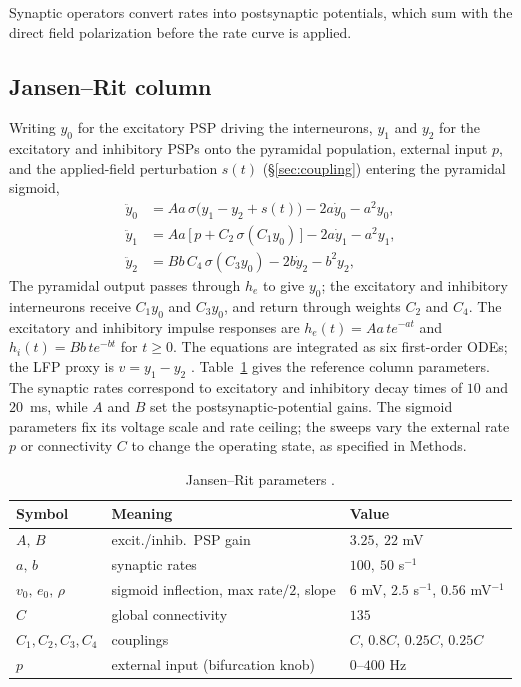 \documentclass[11pt,a4paper]{article}
\newcommand{\Sig}{\sigma}
\begin{document}
Synaptic operators convert rates into postsynaptic potentials, which sum with
the direct field polarization before the rate curve is applied.

\subsection*{Jansen--Rit column}
Writing $y_0$ for the excitatory PSP driving the interneurons, $y_1$ and $y_2$ for the
excitatory and inhibitory PSPs onto the pyramidal population, external input $p$, and the
applied-field perturbation $s(t)$ (\S\ref{sec:coupling}) entering the pyramidal sigmoid,
\begin{align}
\ddot y_0 &= Aa\,\Sig\!\big(y_1-y_2+s(t)\big)-2a\dot y_0-a^2 y_0, \label{eq:jr0}\\
\ddot y_1 &= Aa\,\big[\,p+C_2\,\Sig(C_1 y_0)\,\big]-2a\dot y_1-a^2 y_1,\\
\ddot y_2 &= Bb\,C_4\,\Sig(C_3 y_0)-2b\dot y_2-b^2 y_2,
\end{align}
The pyramidal output passes through $h_e$ to give $y_0$; the excitatory
and inhibitory interneurons receive $C_1y_0$ and $C_3y_0$, and return through
weights $C_2$ and $C_4$. The excitatory and inhibitory impulse responses are
$h_e(t)=Aa\,t e^{-at}$ and $h_i(t)=Bb\,t e^{-bt}$ for $t\ge0$.
The equations are integrated as six first-order ODEs; the LFP proxy is $v=y_1-y_2$ \cite{jansen1995}.
Table~\ref{tab:params} gives the reference column parameters. The synaptic rates
correspond to excitatory and inhibitory decay times of $10$ and $20$~ms, while
$A$ and $B$ set the postsynaptic-potential gains. The sigmoid parameters fix its
voltage scale and rate ceiling; the sweeps vary the external rate $p$ or connectivity
$C$ to change the operating state, as specified in Methods.

\begin{table}[h]\centering\small
\caption{Jansen--Rit parameters \cite{jansen1995}.}
\label{tab:params}
\begin{tabular}{@{}lll@{}}
\toprule
Symbol & Meaning & Value\\
\midrule
$A,\,B$ & excit./inhib.\ PSP gain & $3.25,\ 22$ mV\\
$a,\,b$ & synaptic rates & $100,\ 50$ s$^{-1}$\\
$v_0,\,e_0,\,\rho$ & sigmoid inflection, max rate$/2$, slope & $6$ mV, $2.5$ s$^{-1}$, $0.56$ mV$^{-1}$\\
$C$ & global connectivity & $135$\\
$C_1,C_2,C_3,C_4$ & couplings & $C,\,0.8C,\,0.25C,\,0.25C$\\
$p$ & external input (bifurcation knob) & $0$--$400$ Hz\\
\bottomrule
\end{tabular}
\end{table}
\end{document}
